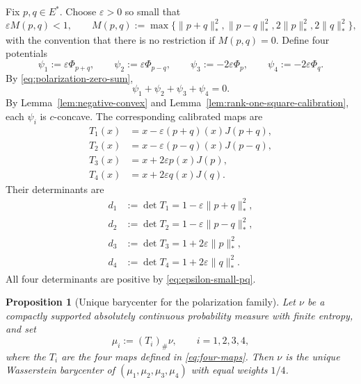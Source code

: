 \documentclass[a4paper,11pt]{article}
\numberwithin{equation}{section}
\newtheorem{proposition}[theorem]{Proposition}
\begin{document}
	Fix \(p,q\in E^*\). Choose \(\varepsilon>0\) so small that
	\begin{equation}\label{eq:epsilon-small-pq}
		\varepsilon M(p,q)<1,
		\qquad
		M(p,q):=\max\{\|p+q\|_*^2,\|p-q\|_*^2,2\|p\|_*^2,2\|q\|_*^2\},
	\end{equation}
	with the convention that there is no restriction if \(M(p,q)=0\). Define four potentials
	\begin{equation}\label{eq:polarization-potentials}
		\psi_1:=\varepsilon\Phi_{p+q},
		\qquad
		\psi_2:=\varepsilon\Phi_{p-q},
		\qquad
		\psi_3:=-2\varepsilon\Phi_p,
		\qquad
		\psi_4:=-2\varepsilon\Phi_q.
	\end{equation}
	By \eqref{eq:polarization-zero-sum},
	\begin{equation}\label{eq:four-zero-sum}
		\psi_1+\psi_2+\psi_3+\psi_4=0.
	\end{equation}
	By Lemma~\ref{lem:negative-convex} and Lemma~\ref{lem:rank-one-square-calibration}, each \(\psi_i\) is \(c\)-concave. The
	corresponding calibrated maps are
	\begin{equation}\label{eq:four-maps}
		\begin{aligned}
			T_1(x)&=x-\varepsilon(p+q)(x)J(p+q),\\
			T_2(x)&=x-\varepsilon(p-q)(x)J(p-q),\\
			T_3(x)&=x+2\varepsilon p(x)J(p),\\
			T_4(x)&=x+2\varepsilon q(x)J(q).
		\end{aligned}
	\end{equation}
	Their determinants are
	\begin{equation}\label{eq:four-determinants}
		\begin{aligned}
			d_1&:=\det T_1=1-\varepsilon\|p+q\|_*^2,\\
			d_2&:=\det T_2=1-\varepsilon\|p-q\|_*^2,\\
			d_3&:=\det T_3=1+2\varepsilon\|p\|_*^2,\\
			d_4&:=\det T_4=1+2\varepsilon\|q\|_*^2.
		\end{aligned}
	\end{equation}
	All four determinants are positive by \eqref{eq:epsilon-small-pq}.
	
	
	
	\begin{proposition}[Unique barycenter for the polarization family]
		\label{prop:polarization-unique-barycenter}
		Let \(\nu\) be a compactly supported absolutely continuous probability measure with finite
		entropy, and set
		\[
		\mu_i:=(T_i)_\#\nu,
		\qquad i=1,2,3,4,
		\]
		where the \(T_i\) are the four maps defined in
		\eqref{eq:four-maps}. Then \(\nu\) is the
		unique Wasserstein barycenter of
		\((\mu_1,\mu_2,\mu_3,\mu_4)\) with equal weights \(1/4\).
	\end{proposition}
	
\end{document}
